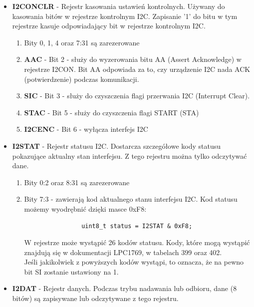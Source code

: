\documentclass{article}
\begin{document}
\begin{itemize}
\begin{enumerate}
        
    \end{enumerate}
    \item \textbf{I2CONCLR} - Rejestr kasowania ustawień kontrolnych. Używany do kasowania bitów w rejestrze kontrolnym I2C. Zapisanie '1' do bitu w tym rejestrze kasuje odpowiadający bit w rejestrze kontrolnym I2C.
    \begin{enumerate}
        \item Bity 0, 1, 4 oraz 7:31 są zarezerowane
        \item \textbf{AAC} - Bit 2 - służy do wyzerowania bitu AA (Assert Acknowledge) w rejestrze I2CON. Bit AA odpowiada za to, czy urządzenie I2C nada ACK (potwierdzenie) podczas komunikacji.
        \item \textbf{SIC} - Bit 3 - służy do czyszczenia flagi przerwania I2C (Interrupt Clear). 
        \item \textbf{STAC} - Bit 5 - służy do czyszczenia flagi START (STA)
        \item \textbf{I2CENC} - Bit 6 - wyłącza interfejs I2C
    \end{enumerate}
    
    \item \textbf{I2STAT} - Rejestr statusu I2C. Dostarcza szczegółowe kody statusu pokazujące aktualny stan interfejsu. Z tego rejestru można tylko odczytywać dane.
    \begin{enumerate}
        \item Bity 0:2 oraz 8:31 są zarezerowane
        \item Bity 7:3 - zawierają kod aktualnego stanu interfejsu I2C.
            Kod statusu możemy wyodrębnić dzięki masce 0xF8:\\
            \begin{verbatim}
                uint8_t status = I2STAT & 0xF8;
            \end{verbatim}

            W rejestrze może wystąpić 26 kodów statusu. Kody, które mogą wystąpić znajdują się w dokumentacji LPC1769, w tabelach 399 oraz 402.\\
            Jeśli jakikolwiek z powyższych kodów wystąpi, to oznacza, że na pewno bit SI zostanie ustawiony na 1.
    \end{enumerate}
    
    
    \item \textbf{I2DAT} - Rejestr danych. Podczas trybu nadawania lub odbioru, dane (8 bitów) są zapisywane lub odczytywane z tego rejestru.   
    

\end{itemize}
\end{document}
